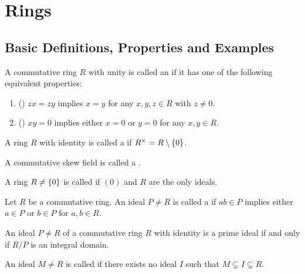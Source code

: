 \section{Rings}
\subsection{Basic Definitions, Properties and Examples}

\begin{definition}
	A commutative ring $R$ with unity is called an  if it has one of the following equivalent properties:

	\begin{enumerate}		
		\item () $zx = zy$ implies $x = y$ for any $x,y,z \in R$ with $z \neq 0$.
		\item () $xy = 0$ implies either $x = 0$ or $y = 0$ for any $x,y \in R$.
	\end{enumerate}
\end{definition}

\begin{definition}
	A ring $R$ with identity is called a  if $R^\times = R\setminus\cbr[0]{0}$.
\end{definition}

\begin{definition}
	A commutative skew field is called a .
\end{definition}

\begin{definition}
	A ring $R \neq \cbr[0]{0}$ is called  if $(0)$ and $R$ are the only ideals.
\end{definition}

\begin{definition}
	Let $R$ be a commutative ring. An ideal $P \neq R$ is called a  if $ab \in P$ implies either $a \in P$ or $b \in P$ for $a,b \in R$.
\end{definition}

\begin{proposition}
	An ideal $P \neq R$ of a commutative ring $R$ with identity is a prime ideal if and only if $R/P$ is an integral domain.
\end{proposition}

\begin{definition}
	An ideal $M \neq R$ is called  if there exists no ideal $I$ such that $M \subsetneq I \subsetneq R$.
\end{definition}

